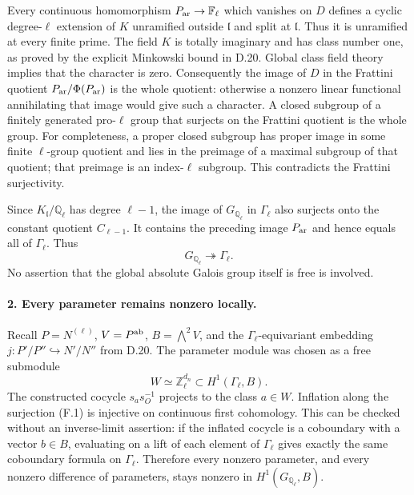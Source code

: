 Every continuous homomorphism $P_{\rm ar}\to\mathbb F_\ell$
which vanishes on $D$ defines a cyclic degree-$\ell$ extension
of $K$ unramified outside $\mathfrak l$ and split at
$\mathfrak l$.  Thus it is unramified at every finite prime.
The field $K$ is totally imaginary and has class number one,
as proved by the explicit Minkowski bound in D.20.  Global
class field theory implies that the character is zero.
Consequently the image of $D$ in the Frattini quotient
$P_{\rm ar}/\Phi(P_{\rm ar})$ is the whole quotient: otherwise
a nonzero linear functional annihilating that image would
give such a character.  A closed subgroup of a finitely
generated pro-$\ell$ group that surjects on the Frattini quotient
is the whole group.  For completeness, a proper closed subgroup
has proper image in some finite $\ell$-group quotient and lies
in the preimage of a maximal subgroup of that quotient; that
preimage is an index-$\ell$ subgroup.  This contradicts the
Frattini surjectivity.

Since $K_{\mathfrak l}/\mathbb Q_\ell$ has degree $\ell-1$,
the image of $G_{\mathbb Q_\ell}$ in $\Gamma_\ell$ also
surjects onto the constant quotient $C_{\ell-1}$.  It contains
the preceding image $P_{\rm ar}$ and hence equals all of
$\Gamma_\ell$.  Thus
\[
                 G_{\mathbb Q_\ell}\twoheadrightarrow\Gamma_\ell.
                                                        \tag{F.1}
\]
No assertion that the global absolute Galois group itself is
free is involved.

\paragraph{2. Every parameter remains nonzero locally.}

Recall $P=N^{(\ell)}$, $V=P^{\rm ab}$,
$B=\bigwedge^2 V$, and the $\Gamma_\ell$-equivariant embedding
$j:P'/P''\hookrightarrow N'/N''$ from D.20.  The parameter
module was chosen as a free submodule
\[
 W\simeq\mathbb Z_\ell^{d_n}
          \subset H^1(\Gamma_\ell,B).
\]
The constructed cocycle $s_a s_O^{-1}$ projects to the class
$a\in W$.  Inflation along the surjection (F.1) is injective
on continuous first cohomology.  This can be checked without
an inverse-limit assertion: if the inflated cocycle is a
coboundary with a vector $b\in B$, evaluating on a lift of
each element of $\Gamma_\ell$ gives exactly the same
coboundary formula on $\Gamma_\ell$.  Therefore every nonzero
parameter, and every nonzero difference of parameters, stays
nonzero in $H^1(G_{\mathbb Q_\ell},B)$.

